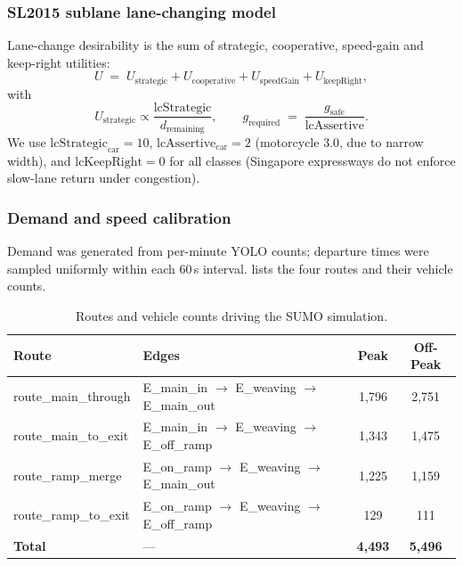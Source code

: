 \documentclass[11pt,a4paper]{article}
\begin{document}
\subsubsection{SL2015 sublane lane-changing model}
Lane-change desirability is the sum of strategic, cooperative, speed-gain and keep-right utilities:
\begin{equation}
U \;=\; U_{\text{strategic}} + U_{\text{cooperative}} + U_{\text{speedGain}} + U_{\text{keepRight}},
\label{eq:lcutil}
\end{equation}
with
\begin{equation}
U_{\text{strategic}} \propto \frac{\text{lcStrategic}}{d_{\text{remaining}}},\qquad
g_{\text{required}} \;=\; \frac{g_{\text{safe}}}{\text{lcAssertive}}.
\label{eq:lcassert}
\end{equation}
We use $\text{lcStrategic}_{\text{car}}=10$, $\text{lcAssertive}_{\text{car}}=2$ (motorcycle 3.0, due to narrow width), and $\text{lcKeepRight}=0$ for all classes (Singapore expressways do not enforce slow-lane return under congestion).

\subsubsection{Demand and speed calibration}
\label{sec:demand}
Demand was generated from per-minute YOLO counts; departure times were sampled uniformly within each 60\,s interval.  lists the four routes and their vehicle counts.

\begin{table}[H]
\centering
\caption{Routes and vehicle counts driving the SUMO simulation.}
\label{tab:routes}
\begin{tabular}{l l c c}
\toprule
\textbf{Route} & \textbf{Edges} & \textbf{Peak} & \textbf{Off-Peak} \\ \midrule
route\_main\_through & E\_main\_in $\to$ E\_weaving $\to$ E\_main\_out & 1{,}796 & 2{,}751 \\
route\_main\_to\_exit & E\_main\_in $\to$ E\_weaving $\to$ E\_off\_ramp & 1{,}343 & 1{,}475 \\
route\_ramp\_merge & E\_on\_ramp $\to$ E\_weaving $\to$ E\_main\_out & 1{,}225 & 1{,}159 \\
route\_ramp\_to\_exit & E\_on\_ramp $\to$ E\_weaving $\to$ E\_off\_ramp & 129 & 111 \\ \midrule
\textbf{Total} & --- & \textbf{4{,}493} & \textbf{5{,}496} \\ \bottomrule
\end{tabular}
\end{table}
\end{document}
